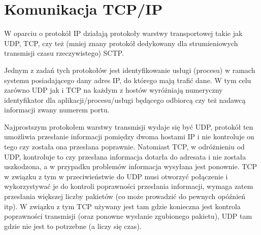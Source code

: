 % 
% 
% 
% 

\section{Komunikacja TCP/IP}

W oparciu o protokół IP działają protokoły warstwy transportowej takie jak UDP, TCP, czy też (mniej znany protokół dedykowany dla  strumieniowych transmisji czasu rzeczywistego) SCTP.

Jednym z zadań tych protokołów jest identyfikowanie usługi (procesu) w ramach systemu posiadającego dany adres IP, do którego mają trafić dane.
W tym celu zarówno UDP jak i TCP na każdym z hostów wyróżniają numeryczny identyfikator dla aplikacji/procesu/usługi będącego odbiorcą czy też nadawcą informacji zwany numerem portu.

Najprostszym protokołem warstwy transmisji wydaje się być UDP, protokół ten umożliwia przesłanie informacji pomiędzy dwoma hostami IP i nie kontroluje on tego czy została ona przesłana poprawnie.
Natomiast TCP, w odróżnieniu od UDP, kontroluje to czy przesłana informacja dotarła do adresata i nie została uszkodzona, a w przypadku problemów informacja wysyłana jest ponownie. TCP w związku z tym w przeciwieństwie do UDP musi otworzyć połączenie i wykorzystywać je do kontroli poprawności przesłania informacji, wymaga zatem przesłania większej liczby pakietów (co może prowadzić do pewnych opóźnień itp).
W związku z tym TCP używany jest tam gdzie konieczna jest kontrola poprawności transmisji (oraz ponowne wysłanie zgubionego pakietu), UDP tam gdzie nie jest to potrzebne (a liczy się czas).

